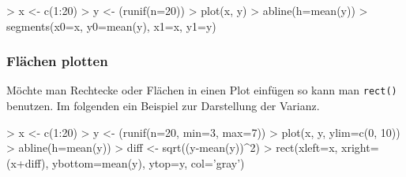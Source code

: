 \begin{Schunk}
\begin{Sinput}
> x <- c(1:20)
> y <- (runif(n=20))
> plot(x, y)
> abline(h=mean(y))
> segments(x0=x, y0=mean(y), x1=x, y1=y)
\end{Sinput}
\end{Schunk}

\subsubsection{Flächen plotten}
Möchte man Rechtecke oder Flächen in einen Plot einfügen so kann man 
\lstinline{rect()} benutzen. Im folgenden ein Beispiel zur Darstellung
der Varianz.

\begin{Schunk}
\begin{Sinput}
> x <- c(1:20)
> y <- (runif(n=20, min=3, max=7))
> plot(x, y, ylim=c(0, 10))
> abline(h=mean(y))
> diff <- sqrt((y-mean(y))^2)
> rect(xleft=x, xright=(x+diff), ybottom=mean(y), ytop=y, col='gray')
\end{Sinput}
\end{Schunk}

